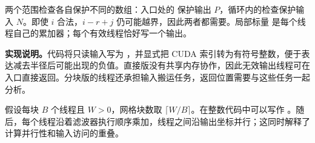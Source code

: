 两个范围检查各自保护不同的数组：入口处的  保护输出 $P$，循环内的检查保护输入 $N$。即使 $i$ 合法，$i-r+j$ 仍可能越界，因此两者都需要。局部标量 \mbox{} 是每个线程自己的累加器；每个有效线程恰好写一个输出。

\textbf{实现说明。}代码将只读输入写为 ，并显式把 CUDA 索引转为有符号整数，便于表达减去半径后可能出现的负值。直接版没有共享内存协作，因此无效输出线程可在入口直接返回。分块版的线程还承担输入搬运任务，返回位置需要与这些任务一起分析。

假设每块 $B$ 个线程且 $W>0$，网格块数取 $\lceil W/B\rceil$。在整数代码中可以写作 。随后，每个线程沿着滤波器执行顺序乘加，线程之间沿输出坐标并行；这同时解释了计算并行性和输入访问的重叠。
\FloatBarrier

